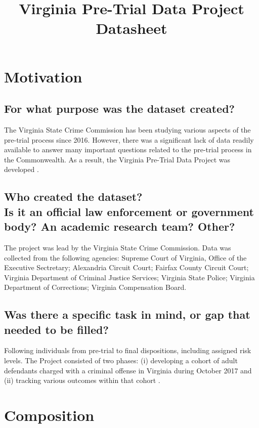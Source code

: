 \documentclass[letterpaper, 10 pt, conference]{ieeeconf}  %
\title{\LARGE \bf
Virginia Pre-Trial Data Project \\{\color{blue}Datasheet}
}
\newcommand{\subtitle}[1]{{\\ \small \normalfont \color{purple} #1}}
\begin{document}
\maketitle
\thispagestyle{empty}
\pagestyle{empty}

\section{Motivation}

\subsection{For what purpose was the dataset created?}

The Virginia State Crime Commission has been studying various aspects of the pre-trial process since 2016.  However, there was a significant lack of data readily available to answer many important questions related to the pre-trial process in the Commonwealth. As a result, the Virginia Pre-Trial Data Project was developed \cite{codebook}. 

\subsection{Who created the dataset? \subtitle{Is it an official law enforcement or government body? An academic research team? Other?}}

The project was lead by the Virginia State Crime Commission. Data was collected from the following agencies: 
Supreme Court of Virginia, Office of the Executive Sectretary; Alexandria Circuit Court; Fairfax County Circuit Court; Virginia Department of Criminal Justice Services;
Virginia State Police; Virginia Department of Corrections; Virginia Compensation Board.

\subsection{Was there a specific task in mind, or gap that needed to be filled?}

Following individuals from pre-trial to final dispositions, including assigned risk levels.
The Project consisted of two phases: (i) developing a cohort of adult defendants charged with a criminal offense in Virginia during October 2017 and (ii) tracking various outcomes within that cohort \cite{codebook}.

\section{Composition}
\end{document}
